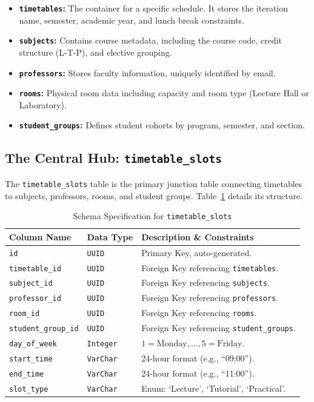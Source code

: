 \begin{itemize}
    \item \textbf{\texttt{timetables}:} The container for a specific schedule. It stores the iteration name, semester, academic year, and lunch break constraints.
    \item \textbf{\texttt{subjects}:} Contains course metadata, including the course code, credit structure (L-T-P), and elective grouping.
    \item \textbf{\texttt{professors}:} Stores faculty information, uniquely identified by email.
    \item \textbf{\texttt{rooms}:} Physical room data including capacity and room type (Lecture Hall or Laboratory).
    \item \textbf{\texttt{student\_groups}:} Defines student cohorts by program, semester, and section.
\end{itemize}

\subsection{The Central Hub: \texttt{timetable\_slots}}
The \texttt{timetable\_slots} table is the primary junction table connecting timetables to subjects, professors, rooms, and student groups. Table~\ref{tab:schema_slots} details its structure.

\begin{table}[htbp]
\centering
\caption{Schema Specification for \texttt{timetable\_slots}}
\label{tab:schema_slots}
\renewcommand{\arraystretch}{1.4}
\begin{tabularx}{\textwidth}{@{} l l X @{}}
\toprule
\textbf{Column Name} & \textbf{Data Type} & \textbf{Description \& Constraints} \\
\midrule
\texttt{id} & \texttt{UUID} & Primary Key, auto-generated. \\
\texttt{timetable\_id} & \texttt{UUID} & Foreign Key referencing \texttt{timetables}. \\
\texttt{subject\_id} & \texttt{UUID} & Foreign Key referencing \texttt{subjects}. \\
\texttt{professor\_id} & \texttt{UUID} & Foreign Key referencing \texttt{professors}. \\
\texttt{room\_id} & \texttt{UUID} & Foreign Key referencing \texttt{rooms}. \\
\texttt{student\_group\_id} & \texttt{UUID} & Foreign Key referencing \texttt{student\_groups}. \\
\texttt{day\_of\_week} & \texttt{Integer} & $1 = \text{Monday}, \dots, 5 = \text{Friday}$. \\
\texttt{start\_time} & \texttt{VarChar} & 24-hour format (e.g., ``09:00''). \\
\texttt{end\_time} & \texttt{VarChar} & 24-hour format (e.g., ``11:00''). \\
\texttt{slot\_type} & \texttt{VarChar} & Enum: `Lecture', `Tutorial', `Practical'. \\
\bottomrule
\end{tabularx}
\end{table}

